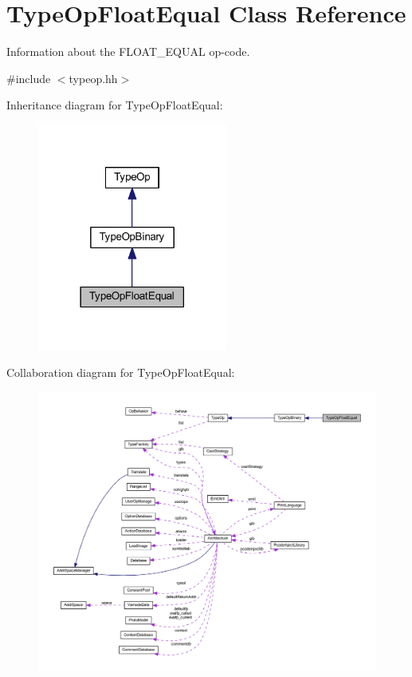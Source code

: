 \hypertarget{class_type_op_float_equal}{}\section{Type\+Op\+Float\+Equal Class Reference}
\label{class_type_op_float_equal}


Information about the F\+L\+O\+A\+T\+\_\+\+E\+Q\+U\+AL op-\/code.  




{\ttfamily \#include $<$typeop.\+hh$>$}



Inheritance diagram for Type\+Op\+Float\+Equal\+:
\nopagebreak
\begin{figure}[H]
\begin{center}
\leavevmode
\includegraphics[width=177pt]{class_type_op_float_equal__inherit__graph}
\end{center}
\end{figure}


Collaboration diagram for Type\+Op\+Float\+Equal\+:
\nopagebreak
\begin{figure}[H]
\begin{center}
\leavevmode
\includegraphics[width=350pt]{class_type_op_float_equal__coll__graph}
\end{center}
\end{figure}
